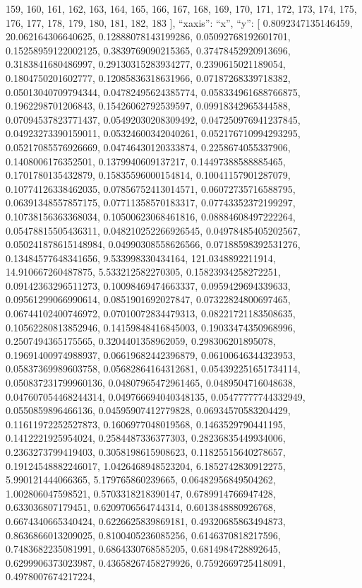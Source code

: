 \documentclass[
]{article}
\begin{document}
159, 160, 161, 162, 163, 164, 165, 166, 167, 168, 169, 170, 171, 172,
173, 174, 175, 176, 177, 178, 179, 180, 181, 182, 183 {]}, ``xaxis'':
``x'', ``y'': {[} 0.8092347135146459, 20.062164306640625,
0.12888078143199286, 0.05092768192601701, 0.15258959122002125,
0.3839769090215365, 0.37478452920913696, 0.3183841680486997,
0.29130315283934277, 0.2390615021189054, 0.1804750201602777,
0.12085836318631966, 0.07187268339718382, 0.05013040709794344,
0.04782495624385774, 0.058334961688766875, 0.1962298701206843,
0.15426062792539597, 0.09918342965344588, 0.07094537823771437,
0.05492030208309492, 0.047250976941237845, 0.04923273390159011,
0.05324600342040261, 0.052176710994293295, 0.05217085576926669,
0.04746430120333874, 0.2258674055337906, 0.1408006176352501,
0.1379940609137217, 0.14497388588885465, 0.1701780135432879,
0.15835596000154814, 0.10041157901287079, 0.10774126338462035,
0.07856752413014571, 0.06072735716588795, 0.06391348557857175,
0.07711358570183317, 0.07743352372199297, 0.10738156363368034,
0.10500623068461816, 0.08884608497222264, 0.05478815505436311,
0.048210252266926545, 0.04978485405202567, 0.050241878615148984,
0.04990308558626566, 0.07188598392531276, 0.13484577648341656,
9.533998330434164, 121.0348892211914, 14.910667260487875,
5.533212582270305, 0.15823934258272251, 0.09142363296511273,
0.10098469474663337, 0.0959429694339633, 0.09561299066990614,
0.0851901692027847, 0.07322824800697465, 0.06744102400746972,
0.07010072834479313, 0.08221721183508635, 0.10562280813852946,
0.14159848416845003, 0.19033474350968996, 0.2507494365175565,
0.3204401358962059, 0.298306201895078, 0.19691400974988937,
0.06619682442396879, 0.06100646344323953, 0.05837369989603758,
0.05682864164312681, 0.054392251651734114, 0.050837231799960136,
0.04807965472961465, 0.0489504716048638, 0.047607054468244314,
0.049766694040348135, 0.05477777744332949, 0.0550859896466136,
0.04595907412779828, 0.06934570583204429, 0.11611972252527873,
0.1606977048019568, 0.1463529790441195, 0.1412221925954024,
0.2584487336377303, 0.28236835449934006, 0.2363273799419403,
0.3058198615908623, 0.11825515640278657, 0.19124548882246017,
1.0426468948523204, 6.1852742830912275, 5.990121444066365,
5.179765860239665, 0.06482956849504262, 1.002806047598521,
0.5703318218390147, 0.6789914766947428, 0.633036807179451,
0.6209706564744314, 0.6013848880926768, 0.6674340665340424,
0.6226625839869181, 0.49320685863494873, 0.8636866013209025,
0.8100405236085256, 0.6146370818217596, 0.7483682235081991,
0.6864330768585205, 0.6814984728892645, 0.6299906373023987,
0.43658267458279926, 0.7592669725418091, 0.4978007674217224,
\end{document}
